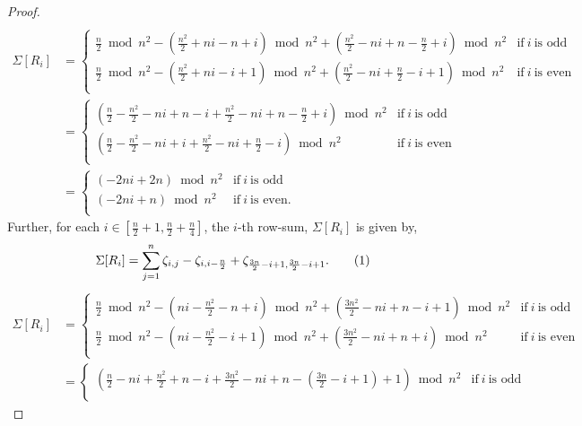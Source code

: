 \documentclass[preprint,11pt]{elsarticle}
\newcommand\numberthis{\addtocounter{equation}{1}\tag{\theequation}}
\begin{document}
\begin{proof}
\begin{align*}
\end{align*}
\begin{align*}
    \Sigma[R_i] & = \begin{cases}\frac{n}{2}\bmod{n^2}-\left(\frac{n^2}{2}+ni-n+i\right)\bmod{n^2} +\left(\frac{n^2}{2}-ni+n-\frac{n}{2}+i\right)\bmod{n^2}  & \text{if}~ i ~ \text{is odd}\\
    \frac{n}{2}\bmod{n^2}-\left(\frac{n^2}{2}+ni-i+1\right)\bmod{n^2} +\left(\frac{n^2}{2}-ni+\frac{n}{2}-i+1\right)\bmod{n^2}  & \text{if}~ i ~ \text{is even}\\
    \end{cases}\\[6pt]
    &= \begin{cases}\left(\frac{n}{2}-\frac{n^2}{2}-ni+n-i +\frac{n^2}{2}-ni+n-\frac{n}{2}+i\right)\bmod{n^2}  & \text{if}~ i ~ \text{is odd}\\
    \left(\frac{n}{2}-\frac{n^2}{2}-ni+i +\frac{n^2}{2}-ni+\frac{n}{2}-i\right)\bmod{n^2}  & \text{if}~ i ~ \text{is even}\\
    \end{cases}
    \\[6pt]
    &= \begin{cases}\left(-2ni+2n\right)\bmod{n^2}  & \text{if}~ i ~ \text{is odd}\\
    \left(-2ni+n\right)\bmod{n^2}  & \text{if}~ i ~ \text{is even}.\\
    \end{cases}
    \end{align*}
Further, for each $i\in [\frac{n}{2}+1, \frac{n}{2}+\frac{n}{4}]$, the $i$-th row-sum, $\Sigma[R_i]$ is given by, 
\[\Sigma[R_i]=\sum_{j=1}^{n}\zeta_{i,j}- \zeta_{i, i-\frac{n}{2}} + \zeta_{\frac{3n}{2}-i+1,\frac{3n}{2}-i+1 }. \numberthis\]
\begin{align*}
    \Sigma[R_i] &  = \begin{cases}\frac{n}{2}\bmod{n^2}-\left(ni-\frac{n^2}{2}-n+i\right)\bmod{n^2} +\left(\frac{3n^2}{2}-ni+n-i+1\right)\bmod{n^2}  & \text{if}~ i ~ \text{is odd}\\
    \frac{n}{2}\bmod{n^2}-\left(ni-\frac{n^2}{2}-i+1\right)\bmod{n^2} +\left(\frac{3n^2}{2}-ni+n+i\right)\bmod{n^2}  & \text{if}~ i ~ \text{is even}\\
    \end{cases}\\[6pt]
    &= \begin{cases}\left(\frac{n}{2}-ni+\frac{n^2}{2}+n-i +\frac{3n^2}{2}-ni+n-(\frac{3n}{2}-i+1)+1\right)\bmod{n^2}  & \text{if}~ i ~ \text{is odd}\\

\end{cases}
\end{align*}
\end{proof}
\end{document}
